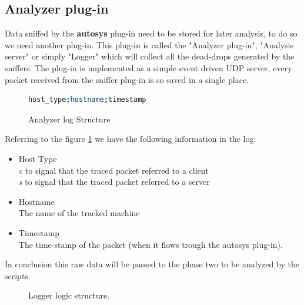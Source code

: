 \subsection{Analyzer plug-in}
Data sniffed by the \textbf{autosys} plug-in need to be stored for later analysis, 
to do so we need another plug-in.
This plug-in is called the "Analyzer plug-in", "Analysis server" or
simply "Logger"
which will collect all the dead-drops generated by the sniffers.
The plug-in is implemented as a simple event driven UDP server, every
packet received from the sniffer plug-in is so saved in a single place.
\begin{figure}[H]
\begin{lstlisting}[language=bash,frame=single]
host_type;hostname;timestamp
\end{lstlisting}
\caption{Analyzer log Structure}
\label{fig:analyzer_pack_struct}
\end{figure}
Referring to the figure \ref{fig:analyzer_pack_struct} we have the following
information in the log:
\begin{itemize}
\item Host Type \hfill \\
\emph{c} to signal that the traced packet referred to a client\\
\emph{s} to signal that the traced packet referred to a server
\item Hostname \hfill \\
The name of the tracked machine
\item Timestamp \hfill \\
The time-stamp of the packet (when it flows trough the autosys plug-in).
\end{itemize}

In conclusion this raw data will be passed to the phase two to be analyzed by the scripts.\\
\begin{figure}[H]
\centering
{}
\caption {Logger logic structure.}
\label{fig:autosys_diagram}
\end{figure}

